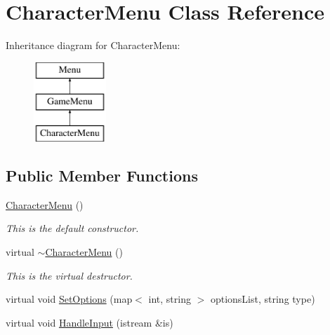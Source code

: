 \hypertarget{classCharacterMenu}{\section{Character\-Menu Class Reference}
\label{classCharacterMenu}
}
Inheritance diagram for Character\-Menu\-:\begin{figure}[H]
\begin{center}
\leavevmode
\includegraphics[height=3.000000cm]{classCharacterMenu}
\end{center}
\end{figure}
\subsection*{Public Member Functions}
\begin{DoxyCompactItemize}
\item 
\hypertarget{classCharacterMenu_a1cccb5ffc144797bd6472e0839c38c03}{\hyperlink{classCharacterMenu_a1cccb5ffc144797bd6472e0839c38c03}{Character\-Menu} ()}\label{classCharacterMenu_a1cccb5ffc144797bd6472e0839c38c03}

\begin{DoxyCompactList}\small\item\em This is the default constructor. \end{DoxyCompactList}\item 
\hypertarget{classCharacterMenu_a13cc9232a05a31d3771f6ef1a2038c18}{virtual \hyperlink{classCharacterMenu_a13cc9232a05a31d3771f6ef1a2038c18}{$\sim$\-Character\-Menu} ()}\label{classCharacterMenu_a13cc9232a05a31d3771f6ef1a2038c18}

\begin{DoxyCompactList}\small\item\em This is the virtual destructor. \end{DoxyCompactList}\item 
virtual void \hyperlink{classCharacterMenu_aeabd6f68d7edaf282be3b61c4103d4f8}{Set\-Options} (map$<$ int, string $>$ options\-List, string type)
\item 
virtual void \hyperlink{classCharacterMenu_a9530ef35d34be27d09f740563dbe59ea}{Handle\-Input} (istream \&is)
\end{DoxyCompactItemize}
